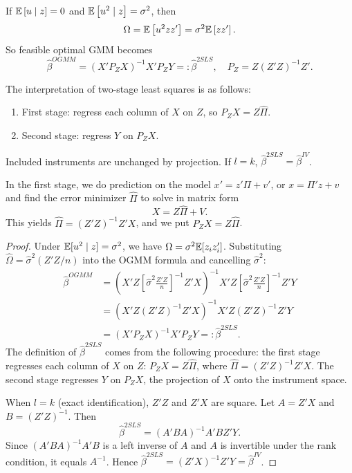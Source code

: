 \begin{proposition}
	If $\mathbb{E}\left[u\mid z\right]=0$ and $\mathbb{E}\left[u^2\mid z\right]=\sigma^2$, then \[
		\Omega = \mathbb{E}\left[u^2 zz'\right] = \sigma^2\mathbb{E}\left[zz'\right]
	.\]
	So feasible optimal GMM becomes \[
		\hat{\beta}^{OGMM} =  (X'P_ZX)^{-1}X'P_ZY =: \hat{\beta}^{2SLS}, \quad P_Z = Z(Z'Z)^{-1}Z'
	.\]

	The interpretation of two-stage least squares is as follows:
	\begin{enumerate}[label=(\roman*)]
		\item First stage: regress each column of $X$ on $Z$, so $P_ZX=Z\hat{\Pi}$.
		\item Second stage: regress $Y$ on $P_ZX$.
	\end{enumerate}
	Included instruments are unchanged by projection. If $l=k$, $\hat{\beta}^{2SLS}=\hat{\beta}^{IV}$.

	In the first stage, we do prediction on the model $x' = z' \Pi + v'$, or $x = \Pi' z + v$ and find the error minimizer $\hat{\Pi}$ to solve in matrix form \[
		X = Z \hat{\Pi} + V
	.\] This yields $\hat{\Pi} = (Z'Z)^{-1}Z'X$, and we put $P_Z X = Z\hat{\Pi}$.
\end{proposition}

\begin{proof}
	Under $\mathbb{E}[u^2\mid z]=\sigma^2$, we have $\Omega = \sigma^2\mathbb{E}[z_iz_i']$. Substituting $\hat{\Omega} = \hat{\sigma}^2(Z'Z/n)$ into the OGMM formula and cancelling $\hat{\sigma}^2$:
	\begin{align*}
		\hat{\beta}^{OGMM}
		&= \left( X'Z \left[ \hat{\sigma}^2 \frac{Z'Z}{n} \right]^{-1} Z'X \right)^{-1} X'Z \left[ \hat{\sigma}^2\frac{Z'Z}{n} \right]^{-1} Z' Y \\
		&= \left( X'Z (Z'Z)^{-1} Z'X \right)^{-1} X'Z (Z'Z)^{-1} Z' Y \\
		&= \left( X'P_Z X \right)^{-1} X'P_ZY =: \hat{\beta}^{2SLS}
	.\end{align*}
	The definition of $\hat{\beta}^{2SLS}$ comes from the following procedure: the first stage regresses each column of $X$ on $Z$: $P_Z X = Z\hat{\Pi}$, where $\hat{\Pi} = (Z'Z)^{-1}Z'X$. The second stage regresses $Y$ on $P_Z X$, the projection of $X$ onto the instrument space.

	When $l=k$ (exact identification), $Z'Z$ and $Z'X$ are square. Let $A=Z'X$ and $B=(Z'Z)^{-1}$. Then
	\[
		\hat{\beta}^{2SLS} = (A'BA)^{-1}A'BZ'Y
	.\]
	Since $(A'BA)^{-1}A'B$ is a left inverse of $A$ and $A$ is invertible under the rank condition, it equals $A^{-1}$. Hence $\hat{\beta}^{2SLS} = (Z'X)^{-1}Z'Y = \hat{\beta}^{IV}$.
\end{proof}

